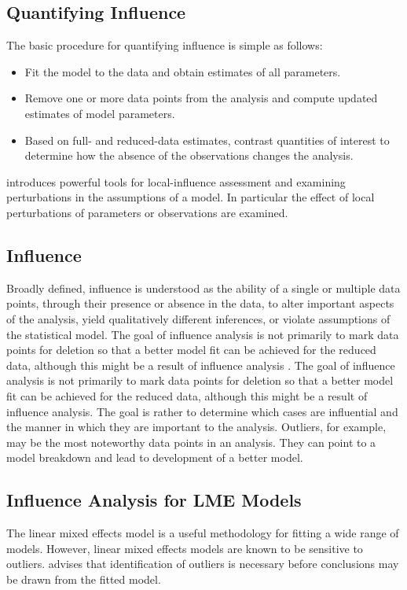 \documentclass[12pt, a4paper]{article}
\begin{document}
\subsection{Quantifying Influence}  %


The basic procedure for quantifying influence is simple as follows:


\begin{itemize}
	\item Fit the model to the data and obtain estimates of all parameters.
	\item Remove one or more data points from the analysis and compute updated estimates of model parameters.
	\item Based on full- and reduced-data estimates, contrast quantities of interest to determine how the absence of the observations changes the analysis.
\end{itemize}


\citet{cook86} introduces powerful tools for local-influence assessment and examining perturbations in the assumptions of a model. In particular the effect of local perturbations of parameters or observations are examined.

	\subsection{Influence}
	
	
	Broadly defined, influence is understood as the ability of a single or multiple data points, through their presence or absence in the data, to alter important aspects of the analysis, yield qualitatively different inferences, or violate assumptions of the statistical model. The goal of influence analysis is not primarily to mark data
	points for deletion so that a better model fit can be achieved for the reduced data, although this might be a result of influence analysis \citep{schabenberger}.			
	The goal of influence analysis is not primarily to mark data
	points for deletion so that a better model fit can be achieved for the reduced data, although this might be a
	result of influence analysis. The goal is rather to determine which cases are influential and the manner in
	which they are important to the analysis. Outliers, for example, may be the most noteworthy data points in
	an analysis. They can point to a model breakdown and lead to development of a better model.
	
	\subsection{Influence Analysis for LME Models} %
	The linear mixed effects model is a useful methodology for fitting a wide range of models. However, linear mixed effects models are known to be sensitive to outliers. \citet{CPJ} advises that identification of outliers is necessary before conclusions may be drawn from the fitted model.
	
\end{document}
